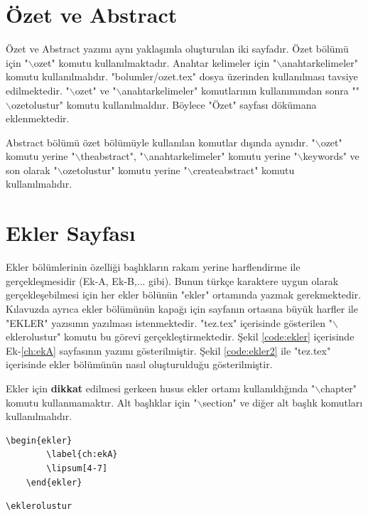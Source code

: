 \chapter{Özet ve Abstract}
\label{ch:ozet}
Özet ve Abstract yazımı aynı yaklaşımla oluşturulan iki sayfadır. Özet bölümü için "$\backslash$ozet" komutu kullanılmaktadır. Anahtar kelimeler için "$\backslash$anahtarkelimeler" komutu kullanılmalıdır. "bolumler/ozet.tex" dosya üzerinden kullanılması tavsiye edilmektedir. "$\backslash$ozet" ve "$\backslash$anahtarkelimeler" komutlarının kullanımından sonra ""$\backslash$ozetolustur" komutu kullanılmaldıır. Böylece "Özet" sayfası dökümana eklenmektedir. 

Abstract bölümü özet bölümüyle kullanılan komutlar dışında aynıdır. "$\backslash$ozet" komutu yerine "$\backslash$theabstract", "$\backslash$anahtarkelimeler" komutu yerine "$\backslash$keywords" ve son olarak "$\backslash$ozetolustur" komutu yerine "$\backslash$createabstract" komutu kullanılmalıdır. 


\chapter{Ekler Sayfası}
\label{ch:ek}
Ekler bölümlerinin özelliği başlıkların rakam yerine harflendirme ile gerçekleşmesidir (Ek-A, Ek-B,... gibi). Bunun türkçe karaktere uygun olarak gerçekleşebilmesi için her ekler bölünün "ekler" ortamında yazmak gerekmektedir. Kılavuzda ayrıca ekler bölümünün kapağı için sayfanın ortasına büyük harfler ile "EKLER" yazısının yazılması istenmektedir. "tez.tex" içerisinde gösterilen "$\backslash$eklerolustur" komutu bu görevi gerçekleştirmektedir. Şekil \ref{code:ekler} içerisinde Ek-\ref{ch:ekA} sayfasının yazımı gösterilmiştir. Şekil \ref{code:ekler2} ile "tez.tex" içerisinde ekler bölümünün nasıl oluşturulduğu gösterilmiştir.

Ekler için \textbf{dikkat}  edilmesi gerkeen husus ekler ortamı kullanıldığında "$\backslash$chapter" komutu kullanmamaktır. Alt başlıklar için "$\backslash$section" ve diğer alt başlık komutları kullanılmalıdır.


\begin{lstlisting}[language={[LaTeX]{TeX}}, label=code:ekler, caption=Örnek ekler sayfası]
	\begin{ekler}
		\label{ch:ekA}
		\lipsum[4-7]
	\end{ekler}
\end{lstlisting}

\begin{lstlisting}[language={[LaTeX]{TeX}}, label=code:ekler2, caption=tez.tex içerisinde ekler bölümünün oluşturulması]
	\eklerolustur
	
\end{lstlisting}


